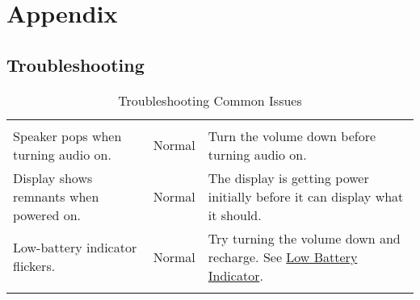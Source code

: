 \part{Appendix}

\chapter{Troubleshooting} \label{Troubleshooting}

\begin{table}[H]
  \centering
  \begin{tabu} { X[3,l,m] | X[2,c,m] | X[5,l,m] }
    \thrule

     &  &  \\ \mdrule

    Speaker pops when turning audio on.
      & Normal
      & Turn the volume down before turning audio on. \\ \mrule

    Display shows remnants when powered on.
      & Normal
      & The display is getting power initially before it can display what
        it should. \\ \mrule

    Low-battery indicator flickers.
      & Normal
      & Try turning the volume down and recharge.
        See \hyperref[Low Battery Indicator]{Low Battery Indicator}. \\

    \bhrule
  \end{tabu}
  \caption{Troubleshooting Common Issues}
\end{table}

